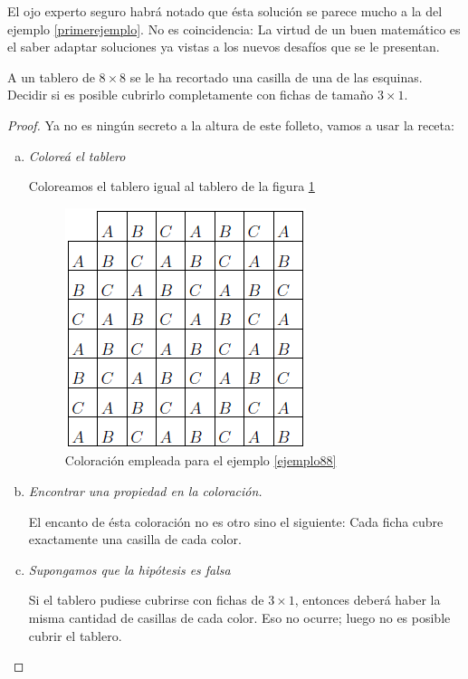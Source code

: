 El ojo experto seguro habr\'a notado que \'esta soluci\'on se parece mucho a la del ejemplo \ref{primerejemplo}. No es coincidencia: La virtud de un buen matem\'atico es el saber adaptar soluciones ya vistas a los nuevos desaf\'ios que se le presentan.

\begin{ejem}\label{ejemplo88}
	A un tablero de $8 \times 8$ se le ha recortado una casilla de una de las esquinas. Decidir si es posible cubrirlo completamente con fichas de tamaño $3 \times 1$.
\end{ejem}

\begin{proof}
	
	Ya no es ning\'un secreto a la altura de este folleto, vamos a usar la receta:
	
	
	\begin{enumerate}[a.]
		
		\item \textit{Colore\'a el tablero}
		
		Coloreamos el tablero igual al tablero de la figura \ref{figura88}
		
		\begin{figure}[h!]
			\centering
			\includegraphics[scale=.65]{imgs/color5.png}
			\caption{Coloraci\'on empleada para el ejemplo \ref{ejemplo88}\label{figura88}}
		\end{figure}
		
		\item \textit{Encontrar una propiedad en la coloraci\'on.}
		
		El encanto de \'esta coloraci\'on no es otro sino el siguiente: Cada ficha cubre exactamente una casilla de cada color. 
		
		\item \textit{Supongamos que la hip\'otesis es falsa}
		
		Si el tablero pudiese cubrirse con fichas de $3 \times 1$, entonces deber\'a haber la misma cantidad de casillas de cada color. Eso no ocurre; luego no es posible cubrir el tablero. 
	\end{enumerate}
\end{proof}


